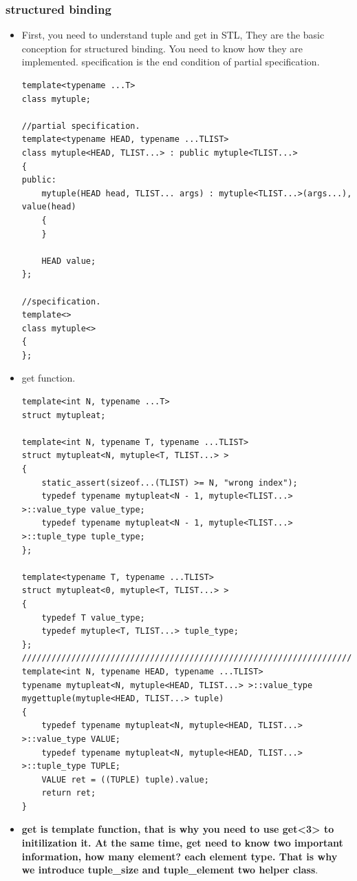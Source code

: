 \documentclass[a4paper,11pt,twoside]{book}
\begin{document}
\subsubsection{structured binding}
\begin{itemize}
		\item First, you need to understand tuple and get in STL, They are the basic conception for structured binding. You need to know how they are implemented. specification is the end condition of partial specification. 
\begin{lstlisting}
template<typename ...T>
class mytuple;

//partial specification.
template<typename HEAD, typename ...TLIST>
class mytuple<HEAD, TLIST...> : public mytuple<TLIST...>
{
public:
    mytuple(HEAD head, TLIST... args) : mytuple<TLIST...>(args...), value(head)
    {
    }

    HEAD value;
};

//specification.
template<>
class mytuple<>
{
};
\end{lstlisting}
\item get function.

\begin{lstlisting}
template<int N, typename ...T>
struct mytupleat;

template<int N, typename T, typename ...TLIST>
struct mytupleat<N, mytuple<T, TLIST...> >
{
    static_assert(sizeof...(TLIST) >= N, "wrong index");
    typedef typename mytupleat<N - 1, mytuple<TLIST...> >::value_type value_type;
    typedef typename mytupleat<N - 1, mytuple<TLIST...> >::tuple_type tuple_type;
};

template<typename T, typename ...TLIST>
struct mytupleat<0, mytuple<T, TLIST...> >
{
    typedef T value_type;
    typedef mytuple<T, TLIST...> tuple_type;
};
///////////////////////////////////////////////////////////////////////////
template<int N, typename HEAD, typename ...TLIST>
typename mytupleat<N, mytuple<HEAD, TLIST...> >::value_type
mygettuple(mytuple<HEAD, TLIST...> tuple)
{
    typedef typename mytupleat<N, mytuple<HEAD, TLIST...> >::value_type VALUE;
    typedef typename mytupleat<N, mytuple<HEAD, TLIST...> >::tuple_type TUPLE;
    VALUE ret = ((TUPLE) tuple).value;
    return ret;
}
\end{lstlisting}

		\item \textbf{get is template function, that is why you need to use get<3> to initilization it. At the same time, get need to know two important information, how many element? each element type. That is why we introduce tuple\_size and tuple\_element two helper class}.



\end{itemize}
\end{document}
